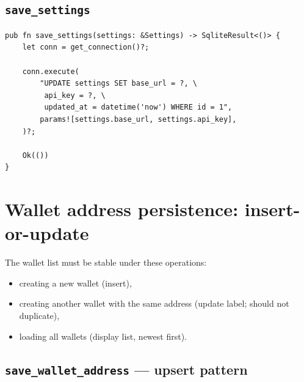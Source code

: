 \subsection{\texttt{save\_settings}}
\label{sec:save-settings}

\begin{listing}[H]
\caption{Updating settings}
\label{lst:ch20-save-settings}
\begin{verbatim}
pub fn save_settings(settings: &Settings) -> SqliteResult<()> {
    let conn = get_connection()?;

    conn.execute(
        "UPDATE settings SET base_url = ?, \
         api_key = ?, \
         updated_at = datetime('now') WHERE id = 1",
        params![settings.base_url, settings.api_key],
    )?;

    Ok(())
}
\end{verbatim}
\end{listing}

\section{Wallet address persistence: insert-or-update}
\label{sec:wallet-crud}

The wallet list must be stable under these operations:

\begin{itemize}
  \item creating a new wallet (insert),
  \item creating another wallet with the same address (update label; should not duplicate),
  \item loading all wallets (display list, newest first).
\end{itemize}

\subsection{\texttt{save\_wallet\_address} --- upsert pattern}
\label{sec:save-wallet-address}

